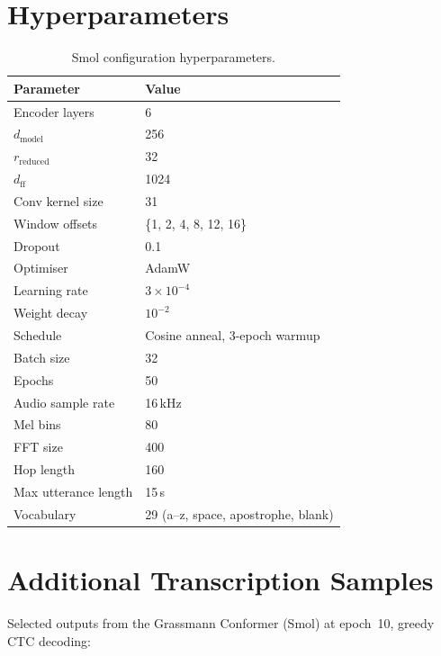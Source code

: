\documentclass[11pt,a4paper]{article}
\begin{document}



\appendix
\section{Hyperparameters}
\label{app:hparams}

\begin{table}[h]
\centering
\caption{Smol configuration hyperparameters.}
\begin{tabular}{ll}
\toprule
Parameter & Value \\
\midrule
Encoder layers & 6 \\
$d_{\mathrm{model}}$ & 256 \\
$r_{\mathrm{reduced}}$ & 32 \\
$d_{\mathrm{ff}}$ & 1024 \\
Conv kernel size & 31 \\
Window offsets & \{1, 2, 4, 8, 12, 16\} \\
Dropout & 0.1 \\
\midrule
Optimiser & AdamW \\
Learning rate & $3 \times 10^{-4}$ \\
Weight decay & $10^{-2}$ \\
Schedule & Cosine anneal, 3-epoch warmup \\
Batch size & 32 \\
Epochs & 50 \\
\midrule
Audio sample rate & 16\,kHz \\
Mel bins & 80 \\
FFT size & 400 \\
Hop length & 160 \\
Max utterance length & 15\,s \\
Vocabulary & 29 (a--z, space, apostrophe, blank) \\
\bottomrule
\end{tabular}
\end{table}

\section{Additional Transcription Samples}
\label{app:samples}

Selected outputs from the Grassmann Conformer (Smol) at epoch~10, greedy CTC decoding:
\end{document}
